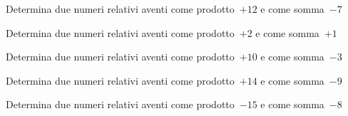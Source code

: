 \begin{multicols}{2}
\begin{esercizio}
 Determina due numeri relativi aventi come prodotto~$+12$ e come somma~$-7$
\end{esercizio}

\begin{esercizio}
 Determina due numeri relativi aventi come prodotto~$+2$ e come somma~$+1$
\end{esercizio}

\begin{esercizio}
 Determina due numeri relativi aventi come prodotto~$+10$ e come somma~$-3$
\end{esercizio}

\begin{esercizio}
 Determina due numeri relativi aventi come prodotto~$+14$ e come somma~$-9$
\end{esercizio}

\begin{esercizio}
 Determina due numeri relativi aventi come prodotto~$-15$ e come somma~$-8$
\end{esercizio}

\end{multicols}

